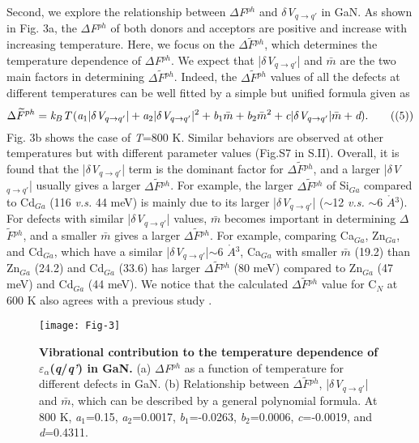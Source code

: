 \documentclass[onecolumn,preprint,superscriptaddress]{revtex4-1}
\begin{document}
Second, we explore the relationship between $\Delta$\emph{F}$^{ph}$ and $\delta$\emph{V}$_{q\rightarrow q'}$ in GaN. As shown in Fig. 3a, the $\Delta$\emph{F}$^{ph}$ of both donors and acceptors are positive and increase with increasing temperature. Here, we focus on the $\Delta$$\widetilde{F}$$^{ph}$, which determines the temperature dependence of $\Delta$\emph{F}$^{ph}$. We expect that |$\delta$\emph{V}$_{q\rightarrow q'}$| and $\bar{m}$ are the two main factors in determining $\Delta$$\widetilde{F}$$^{ph}$. Indeed, the $\Delta$$\widetilde{F}$$^{ph}$ values of all the defects at different temperatures can be well fitted by a simple but unified formula given as
\begin{equation}
\Delta\widetilde{F}^{ph}=\emph{k}_{B}\emph{T}\,(\emph{a}_{1}|\delta\emph{V}_{q\rightarrow q'}|+\emph{a}_{2}|\delta\emph{V}_{q\rightarrow q'}|^2
+\emph{b}_{1}\bar{m}+\emph{b}_{2}\bar{m}^2+\emph{c}|\delta\emph{V}_{q\rightarrow q'}|\bar{m}+\emph{d}).    \tag{(5)}
\end{equation}
Fig. 3b shows the case of \emph{T}=800 K. Similar behaviors are observed at other temperatures but with different parameter values (Fig.S7 in S.II). Overall, it is found that the |$\delta$\emph{V}$_{q\rightarrow q'}$| term is the dominant factor for $\Delta$$\widetilde{F}$$^{ph}$, and a larger |$\delta$\emph{V}$_{q\rightarrow q'}$| usually gives a larger $\Delta$$\widetilde{F}$$^{ph}$. For example, the larger $\Delta$$\widetilde{F}$$^{ph}$ of Si$_{Ga}$ compared to Cd$_{Ga}$ (116 \emph{v.s.} 44 meV) is mainly due to its larger |$\delta$\emph{V}$_{q\rightarrow q'}$| ($\sim$12 \emph{v.s.} $\sim$6 $\mathring{A}$$^3$). For defects with similar |$\delta$\emph{V}$_{q\rightarrow q'}$| values, $\bar{m}$ becomes important in determining $\Delta$$\widetilde{F}$$^{ph}$, and a smaller $\bar{m}$ gives a larger $\Delta$$\widetilde{F}$$^{ph}$. For example, comparing Ca$_{Ga}$, Zn$_{Ga}$, and Cd$_{Ga}$, which have a similar |$\delta$\emph{V}$_{q\rightarrow q'}$|$\sim$6 $\mathring{A}$$^3$, Ca$_{Ga}$ with smaller $\bar{m}$ (19.2) than Zn$_{Ga}$ (24.2) and Cd$_{Ga}$ (33.6) has larger $\Delta$$\widetilde{F}$$^{ph}$ (80 meV) compared to Zn$_{Ga}$ (47 meV) and Cd$_{Ga}$ (44 meV). We notice that the calculated $\Delta$$\widetilde{F}$$^{ph}$ value for C$_{N}$ at 600 K also agrees with a previous study \cite{19}.

\begin{figure}[htb!]
\texttt{[image: Fig-3]}
\caption{\label{fig:structure} \textbf{Vibrational contribution to the temperature dependence of $\varepsilon$$_{\alpha}$(\emph{q}/\emph{q'}) in GaN.}
(a) $\Delta$\emph{F}$^{ph}$ as a function of temperature for different defects in GaN. (b) Relationship between $\Delta$$\widetilde{F}$$^{ph}$, |$\delta$\emph{V}$_{q\rightarrow q'}$| and $\bar{m}$, which can be described by a general polynomial formula. At 800 K, \emph{a}$_{1}$=0.15, \emph{a}$_{2}$=0.0017, \emph{b}$_{1}$=-0.0263, \emph{b}$_{2}$=0.0006, \emph{c}=-0.0019, and \emph{d}=0.4311.}
\label{3}
\end{figure}
\end{document}
